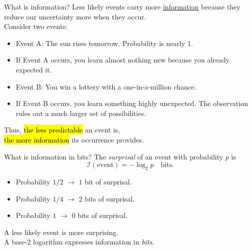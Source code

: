 \documentclass[aspectratio=43,11pt]{beamer}
\begin{document}
\begin{frame}{What is information?}
Less likely events carry more \ul{information} because they reduce our uncertainty more when they occur.\\
\medskip
Consider two events:
\begin{itemize}
\item Event A: The sun rises tomorrow. Probability is nearly 1.
\item[\rightarrow] If Event A occurs, you learn almost nothing new because you already expected it.\\
\item Event B: You win a lottery with a one-in-a-million chance.
\item[\rightarrow] If Event B occurs, you learn something highly unexpected. The observation rules out a much larger set of possibilities.\\
\end{itemize}
\medskip
Thus, \hl{the less predictable} an event is,\\\hl{the more information} its occurrence provides.
\end{frame}

\begin{frame}{What is information in bits?}
The \emph{surprisal} of an event with probability $p$ is
\[
\mathcal I(\text{event})=-\log_2 p\quad\text{bits}.
\]
\begin{itemize}
\item Probability $1/2$ $\rightarrow$ $1$ bit of surprisal.
\item Probability $1/4$ $\rightarrow$ $2$ bits of surprisal.
\item Probability $1$ $\rightarrow$ $0$ bits of surprisal.
\end{itemize}
\medskip
A less likely event is more surprising.\\
A base-2 logarithm expresses information in \emph{bits}.
\end{frame}
\end{document}
